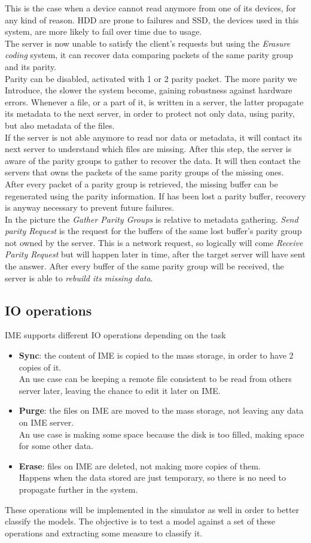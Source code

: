 This is the case when a device cannot read anymore from one of its devices, for
any kind of reason. HDD are prone to failures and SSD, the devices used in this
system, are more likely to fail over time due to usage. \\
The server is now unable to satisfy the client's requests
but using the \textit{Erasure coding} system, it can recover data comparing
packets of the same parity group and its parity. \\
Parity can be disabled, activated with 1 or 2 parity packet. The more parity we
Introduce, the slower the system become, gaining robustness against hardware errors.
Whenever a file, or a part of it, is written in a server, the latter propagate
its metadata to the next server, in order to protect not only data, using
parity, but also metadata of the files. \\
If the server is not able anymore to read nor data or metadata, it will contact
its next server to understand which files are missing. After this step, the
server is aware of the parity groups to gather to recover the data. It will then
contact the servers that owns the packets of the same parity groups of the
missing ones. \\
After every packet of a parity group is retrieved, the missing buffer can be
regenerated using the parity information. If has been lost a parity buffer,
recovery is anyway necessary to prevent future failures. \\
In the picture the \textit{Gather Parity Groups} is relative to metadata
gathering. \textit{Send parity Request} is the request for the buffers of the
same lost buffer's parity group not owned by the server. This is a network
request, so logically will come \textit{Receive Parity Request} but will happen
later in time, after the target server will have sent the answer.
After every buffer of the same parity group will be received, the server is able
to \textit{rebuild its missing data}.


\subsection{IO operations}
IME supports different IO operations depending on the task
\begin{itemize}
    \item \textbf{Sync}: the content of IME is copied to the mass storage, in
        order to have 2 copies of it. \\
        An use case can be keeping a remote file consistent to be read from
        others server later, leaving the chance to edit it later on IME.
    \item \textbf{Purge}: the files on IME are moved to the mass storage, not
        leaving any data on IME server. \\
        An use case is making some space because the disk is too filled, making
        space for some other data.
    \item \textbf{Erase}: files on IME are deleted, not making more copies of
        them. \\
        Happens when the data stored are just temporary, so there is no need to
        propagate further in the system.
\end{itemize}

These operations will be implemented in the simulator as well in order to better
classify the models. The objective is to test a model against a set of these
operations and extracting some measure to classify it.
